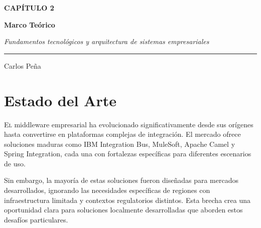 \documentclass[11pt, spanish, letterpaper, twocolumn]{book}
\begin{document}
\thispagestyle{empty}
\null\vfill
\begin{center}
    
    {\fontsize{11}{13}\selectfont\color{sandraAccent}\bfseries\uppercase{Capítulo 2}\par}
    \vspace{0.8cm}
    {\fontsize{28}{34}\selectfont\bfseries\color{sandraDark}Marco Teórico\par}
    \vspace{0.3cm}
    {\fontsize{12}{15}\selectfont\color{sandraText}\itshape Fundamentos tecnológicos y arquitectura de sistemas empresariales\par}
    \vspace{1cm}
    \rule{0.25\linewidth}{1pt}
    \vspace{0.5cm}
    {\fontsize{10}{12}\selectfont\color{sandraGray}Carlos Peña}
\end{center}
\vfill
\clearpage

\section{Estado del Arte}

\lettrine{E}{l} middleware empresarial ha evolucionado significativamente desde sus orígenes hasta convertirse en plataformas complejas de integración. El mercado ofrece soluciones maduras como IBM Integration Bus, MuleSoft, Apache Camel y Spring Integration, cada una con fortalezas específicas para diferentes escenarios de uso.

Sin embargo, la mayoría de estas soluciones fueron diseñadas para mercados desarrollados, ignorando las necesidades específicas de regiones con infraestructura limitada y contextos regulatorios distintos. Esta brecha crea una oportunidad clara para soluciones localmente desarrolladas que aborden estos desafíos particulares.
\end{document}
